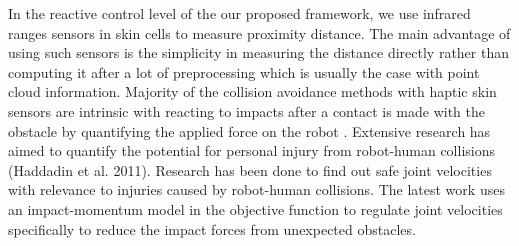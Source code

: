 In the reactive control level of the our proposed framework, we use infrared ranges sensors in skin cells to measure proximity distance. The main advantage of using such sensors is the simplicity in measuring the distance directly rather than computing it after a lot of preprocessing which is usually the case with point cloud information. Majority of the collision avoidance methods with haptic skin sensors are intrinsic with reacting to impacts after a contact is made with the obstacle by quantifying the applied force on the robot \cite{haddadin2008collision,de2004adapt,de2006collision,phan2011capacitive}. Extensive research has aimed to quantify the potential for personal injury from robot-human collisions (Haddadin et al. 2011). Research has been done to find out safe joint velocities with relevance to injuries caused by robot-human collisions\cite{haddadin2011dynamic,haddadin2012truly}. The latest work \cite{Killpack2016} uses an impact-momentum model in the objective function to regulate joint velocities specifically to reduce the impact forces from unexpected obstacles.




